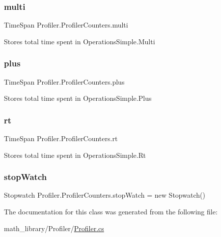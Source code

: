 \subsubsection{\texorpdfstring{multi}{multi}}
{\footnotesize\ttfamily Time\+Span Profiler.\+Profiler\+Counters.\+multi}

Stores total time spent in Operations\+Simple.\+Multi \mbox{\label{classProfiler_1_1ProfilerCounters_a7d3db6b95783e38c6af22eb8a96655b7}} 
\subsubsection{\texorpdfstring{plus}{plus}}
{\footnotesize\ttfamily Time\+Span Profiler.\+Profiler\+Counters.\+plus}

Stores total time spent in Operations\+Simple.\+Plus \mbox{\label{classProfiler_1_1ProfilerCounters_a86dc3e4fb8757b2816bfaa96931879e2}} 
\subsubsection{\texorpdfstring{rt}{rt}}
{\footnotesize\ttfamily Time\+Span Profiler.\+Profiler\+Counters.\+rt}

Stores total time spent in Operations\+Simple.\+Rt \mbox{\label{classProfiler_1_1ProfilerCounters_a39d6525c2377e935b8dbb991dccd319e}} 
\subsubsection{\texorpdfstring{stop\+Watch}{stopWatch}}
{\footnotesize\ttfamily Stopwatch Profiler.\+Profiler\+Counters.\+stop\+Watch = new Stopwatch()}



The documentation for this class was generated from the following file\+:\begin{DoxyCompactItemize}
\item 
math\+\_\+library/\+Profiler/\hyperlink{Profiler_8cs}{Profiler.\+cs}\end{DoxyCompactItemize}

